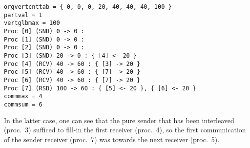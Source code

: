 \begin{lstlisting}
orgvertcnttab = { 0, 0, 0, 20, 40, 40, 40, 100 }
partval = 1
vertglbmax = 100
Proc [0] (SND) 0 -> 0 : 
Proc [1] (SND) 0 -> 0 : 
Proc [2] (SND) 0 -> 0 : 
Proc [3] (SND) 20 -> 0 : { [4] <- 20 }
Proc [4] (RCV) 40 -> 60 : { [3] -> 20 }
Proc [5] (RCV) 40 -> 60 : { [7] -> 20 }
Proc [6] (RCV) 40 -> 60 : { [7] -> 20 }
Proc [7] (RSD) 100 -> 60 : { [5] <- 20 }, { [6] <- 20 }
commmax = 4
commsum = 6
\end{lstlisting}
In the latter case, one can see that the pure sender that has been
interleaved (proc.~3) sufficed to fill-in the first receiver
(proc.~4), so the first communication of the sender receiver (proc.~7)
was towards the next receiver (proc.~5).

